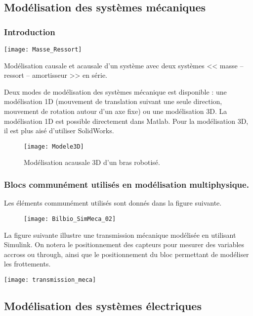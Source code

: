 \subsection{Modélisation des systèmes mécaniques}
\subsubsection{Introduction}

\begin{marginfigure}[-1.5cm]
\texttt{[image: Masse\_Ressort]}

\caption{Modélisation causale et acausale d'un système avec deux systèmes << masse -- ressort -- amortisseur >> en série.}
\end{marginfigure}

Deux modes de modélisation des systèmes mécanique est disponible : une modélisation 1D (mouvement de translation suivant une seule direction, mouvement de rotation autour d'un axe fixe) ou une modélisation 3D. 
La modélisation 1D est possible directement dans Matlab. Pour la modélisation 3D, il est plus aisé d'utiliser SolidWorks. 


\begin{figure}[!h]
\texttt{[image: Modele3D]}

\caption{Modélisation acausale 3D d'un bras robotisé.}
\end{figure}

\subsubsection{Blocs communément utilisés en modélisation multiphysique.}
Les éléments communément utilisés sont donnés dans la figure suivante. 

\begin{figure*}[!h]
\texttt{[image: Bilbio\_SimMeca\_02]}
\end{figure*}

La figure suivante illustre une transmission mécanique modélisée en utilisant Simulink. On notera le positionnement des capteurs pour mesurer des variables accross ou through, ainsi que le positionnement du bloc permettant de modéliser les frottements.

\begin{center}
\texttt{[image: transmission\_meca]}
\end{center}

\subsection{Modélisation des systèmes électriques}

